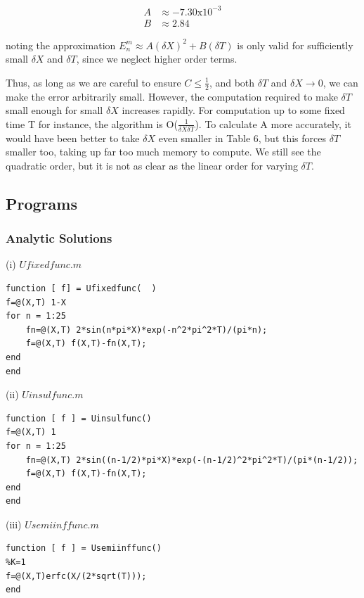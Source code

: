 \documentclass[10pt,a4paper]{report}
\begin{document}
\begin{align*}
A &\approx -7.30\text{x}10^{-3}\\
B &\approx 2.84
\end{align*}

noting the approximation $E_n^m \approx A(\delta X)^2 + B(\delta T)$ is only valid for sufficiently small $\delta X$ and $\delta T$, since we neglect higher order terms.

\vspace{0.5cm}

Thus, as long as we are careful to ensure $C\leq\frac{1}{2}$, and both $\delta T$ and $\delta X \rightarrow 0$, we can make the error arbitrarily small. However, the computation required to make $\delta T$ small enough for small $\delta X$ increases rapidly. For computation up to some fixed time T for instance, the algorithm is O($\frac{1}{\delta X\delta T}$). To calculate A more accurately, it would have been better to take $\delta X$ even smaller in Table 6, but this forces $\delta T$ smaller too, taking up far too much memory to compute. We still see the quadratic order, but it is not as clear as the linear order for varying $\delta T$.

\newpage

\subsection*{Programs}
\vspace{1cm}
\subsubsection*{Analytic Solutions}
\vspace{0.5cm}

(i) $Ufixedfunc.m$
\begin{verbatim}
function [ f] = Ufixedfunc(  )
f=@(X,T) 1-X
for n = 1:25
    fn=@(X,T) 2*sin(n*pi*X)*exp(-n^2*pi^2*T)/(pi*n);
    f=@(X,T) f(X,T)-fn(X,T);
end
end
\end{verbatim}
\vspace{0.5cm}

(ii) $Uinsulfunc.m$
\begin{verbatim}
function [ f ] = Uinsulfunc()
f=@(X,T) 1
for n = 1:25
    fn=@(X,T) 2*sin((n-1/2)*pi*X)*exp(-(n-1/2)^2*pi^2*T)/(pi*(n-1/2));
    f=@(X,T) f(X,T)-fn(X,T);
end
end
\end{verbatim}
\vspace{0.5cm}
 
(iii) $Usemiinffunc.m$
\begin{verbatim}
function [ f ] = Usemiinffunc()
%K=1
f=@(X,T)erfc(X/(2*sqrt(T)));
end
\end{verbatim}
\vspace{0.5cm}
\end{document}
